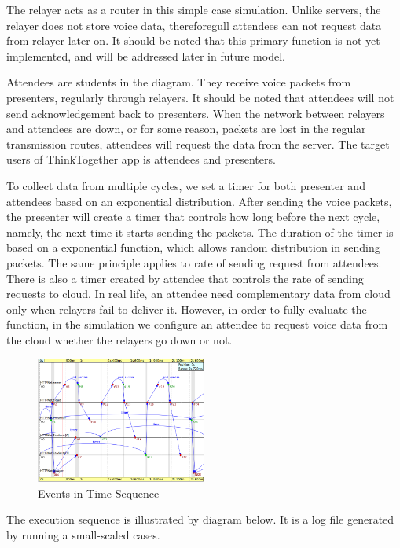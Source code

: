 The relayer acts as a router in this simple case simulation. Unlike servers, 
the relayer 
does 
not store voice data, thereforegull attendees can not request data from relayer 
later on. It should be noted that this primary function is not yet implemented, 
and will be 
addressed later in future model. 

Attendees are students in the diagram. They receive voice packets from 
presenters, regularly through relayers. It should be noted that attendees will 
not send 
acknowledgement back to presenters. When the network between relayers and 
attendees are down, or for some reason, packets are lost in the regular 
transmission routes, attendees will request the data from the server. The 
target 
users of ThinkTogether app is attendees and presenters.  

To collect data from multiple cycles, we set a timer for both presenter and 
attendees based on an exponential distribution. After sending the voice 
packets, 
the presenter will create a timer that controls how long before the next cycle, 
namely, the next time it starts sending the packets. The duration of the timer 
is based on a exponential function, which allows random distribution in sending 
packets. The same principle applies to rate of sending request from attendees. 
There is also a timer created by attendee that controls the rate of sending 
requests to cloud. In real life, an attendee need complementary data from cloud 
only when relayers fail to deliver it. However, in order to fully evaluate the 
function, in the simulation we configure an attendee to request voice data from 
the cloud whether the relayers go down or not.

\begin{figure}[h!]
  \centering
    \includegraphics[width=0.5\textwidth]{figures/r_seq.png}
  \caption{Events in Time Sequence}
  \label{fig:r_seq}
\end{figure}

The execution sequence is illustrated by diagram below. It is a log file 
generated by running a small-scaled cases. 



